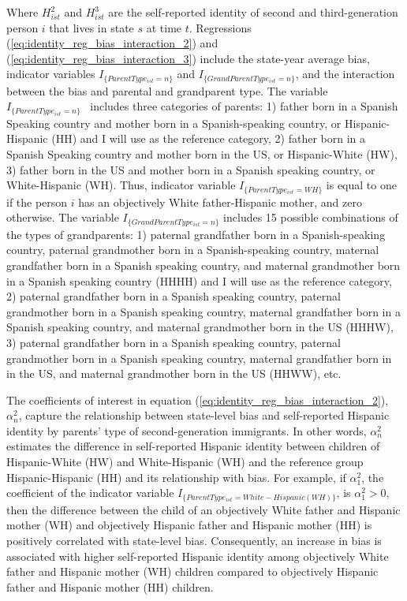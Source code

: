 \documentclass[12pt, fullpage]{article}
\begin{document}
Where $H_{ist}^2$ and $H_{ist}^3$ are the self-reported identity of second and third-generation person $i$ that lives in state $s$ at time $t$. Regressions (\ref{eq:identity_reg_bias_interaction_2}) and (\ref{eq:identity_reg_bias_interaction_3}) include the state-year average bias, indicator variables $I_{\{ParentType_{ist} = n\}}$ and $I_{\{GrandParentType_{ist} = n\}}$, and the interaction between the bias and parental and grandparent type. The variable ~$I_{\{ParentType_{ist} = n\}}$ ~includes three categories of parents: 1) father born in a Spanish Speaking country and mother born in a Spanish-speaking country, or Hispanic-Hispanic (HH) and I will use as the reference category, 2) father born in a Spanish Speaking country and mother born in the US, or Hispanic-White (HW), 3) father born in the US and mother born in a Spanish speaking country, or White-Hispanic (WH). Thus, indicator variable $I_{\{ParentType_{ist} = WH \}}$ is equal to one if the person $i$ has an objectively White father-Hispanic mother, and zero otherwise. The variable $I_{\{GrandParentType_{ist} = n\}}$ includes 15 possible combinations of the types of grandparents: 1) paternal grandfather born in a Spanish-speaking country, paternal grandmother born in a Spanish-speaking country, maternal grandfather born in a Spanish speaking country, and maternal grandmother born in a Spanish speaking country (HHHH) and I will use as the reference category, 2) paternal grandfather born in a Spanish speaking country, paternal grandmother born in a Spanish speaking country, maternal grandfather born in a Spanish speaking country, and maternal grandmother born in the US (HHHW), 3) paternal grandfather born in a Spanish speaking country, paternal grandmother born in a Spanish speaking country, maternal grandfather born in in the US, and maternal grandmother born in the US (HHWW), etc. 

The coefficients of interest in equation (\ref{eq:identity_reg_bias_interaction_2}), $\alpha_n^2$, capture the relationship between state-level bias and self-reported Hispanic identity by parents' type of second-generation immigrants. In other words, $\alpha_n^2$ estimates the difference in self-reported Hispanic identity between children of Hispanic-White (HW) and White-Hispanic (WH) and the reference group Hispanic-Hispanic (HH) and its relationship with bias. For example, if $\alpha_1^2$, the coefficient of the indicator variable $I_{\{ParentType_{ist} = White-Hispanic (WH)\}}$, is $\alpha_1^2 > 0$, then the difference between the child of an objectively White father and Hispanic mother (WH) and objectively Hispanic father and Hispanic mother (HH) is positively correlated with state-level bias. Consequently, an increase in bias is associated with higher self-reported Hispanic identity among objectively White father and Hispanic mother (WH) children compared to objectively Hispanic father and Hispanic mother (HH) children. 
\end{document}

